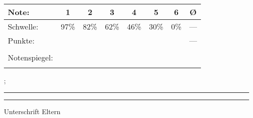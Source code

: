 {\begin{minipage}{0.45\textwidth}
	\renewcommand{\arraystretch}{1}
	{
		\begin{center}
		\begin{tabular}{|l||c|c|c|c|c|c||c|}
			\hline
			Note: & 1&2&3&4&5&6&\O\\\hline
			Schwelle:& 97\% & 82\% & 62\% & 46\% & 30\% & 0\%&---  \\\hline
			Punkte:& \fpeval{round(2*0.97*\value{gesamt})/2} & \fpeval{round(2*0.82*\value{gesamt})/2} & \fpeval{round(2*0.62*\value{gesamt})/2} & \fpeval{round(2*0.46*\value{gesamt})/2} & \fpeval{round(2*0.3*\value{gesamt})/2} & \fpeval{round(2*0.0*\value{gesamt})/2}&--- \\\hline
			& & & & & &  &\\
			Notenspiegel: & & & & & && \\ 
			& & & & & & &\\\hline
		\end{tabular}
	\end{center}
	}
\end{minipage}
\hspace{0.1\textwidth}
\begin{minipage}{0.4\textwidth}
	\vspace{1.5cm}
	\raggedleft\DATUM; \rule[0ex]{4cm}{1pt}
	
	\vspace{1cm}
	\raggedleft \rule[0ex]{4cm}{1pt}
	
	Unterschrift Eltern
	\vspace{1cm}
\end{minipage}
}

